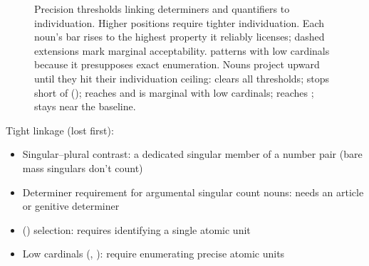 \documentclass[12pt,a4paper]{article}
\begin{document}
\begin{figure}[t]
\caption{Precision thresholds linking determiners and quantifiers to individuation. Higher positions require tighter individuation. Each noun's bar rises to the highest property it reliably licenses; dashed extensions mark marginal acceptability.  patterns with low cardinals because it presupposes exact enumeration. Nouns project upward until they hit their individuation ceiling:  clears all thresholds;  stops short of ();  reaches  and is marginal with low cardinals;  reaches ;  stays near the baseline.}
\label{fig:threshold}
\end{figure}

Tight linkage (lost first):
\begin{itemize}
\item Singular--plural contrast: a dedicated singular member of a number pair (bare mass singulars don't count)
\item Determiner requirement for argumental singular count nouns: needs an article or genitive determiner
\item {}() selection: requires identifying a single atomic unit
\item Low cardinals (, ): require enumerating precise atomic units
\end{itemize}
\end{document}
